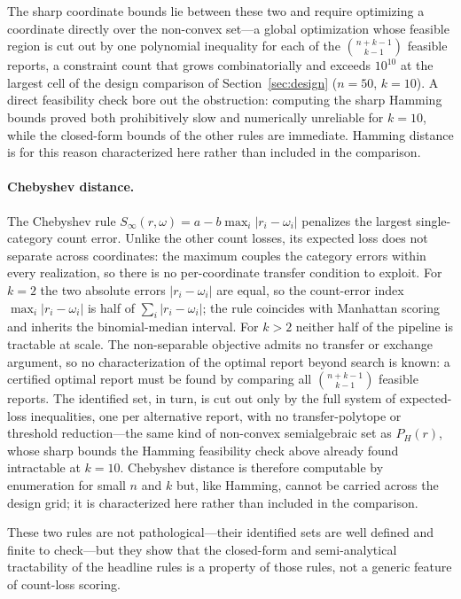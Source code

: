 The sharp coordinate bounds lie between these two and require optimizing a coordinate directly over the non-convex set---a global optimization whose feasible region is cut out by one polynomial inequality for each of the \(\binom{n+k-1}{k-1}\) feasible reports, a constraint count that grows combinatorially and exceeds \(10^{10}\) at the largest cell of the design comparison of Section~\ref{sec:design} (\(n=50\), \(k=10\)).
A direct feasibility check bore out the obstruction: computing the sharp Hamming bounds proved both prohibitively slow and numerically unreliable for \(k=10\), while the closed-form bounds of the other rules are immediate.
Hamming distance is for this reason characterized here rather than included in the comparison.

\paragraph{Chebyshev distance.}
The Chebyshev rule \(S_\infty(r,\omega)=a-b\max_i|r_i-\omega_i|\) penalizes the largest single-category count error.
Unlike the other count losses, its expected loss does not separate across coordinates: the maximum couples the category errors within every realization, so there is no per-coordinate transfer condition to exploit.
For \(k=2\) the two absolute errors \(|r_i-\omega_i|\) are equal, so the count-error index \(\max_i|r_i-\omega_i|\) is half of \(\sum_i|r_i-\omega_i|\); the rule coincides with Manhattan scoring and inherits the binomial-median interval.
For \(k>2\) neither half of the pipeline is tractable at scale.
The non-separable objective admits no transfer or exchange argument, so no characterization of the optimal report beyond search is known: a certified optimal report must be found by comparing all \(\binom{n+k-1}{k-1}\) feasible reports.
The identified set, in turn, is cut out only by the full system of expected-loss inequalities, one per alternative report, with no transfer-polytope or threshold reduction---the same kind of non-convex semialgebraic set as \(P_H(r)\), whose sharp bounds the Hamming feasibility check above already found intractable at \(k=10\).
Chebyshev distance is therefore computable by enumeration for small \(n\) and \(k\) but, like Hamming, cannot be carried across the design grid; it is characterized here rather than included in the comparison.

These two rules are not pathological---their identified sets are well defined and finite to check---but they show that the closed-form and semi-analytical tractability of the headline rules is a property of those rules, not a generic feature of count-loss scoring.
